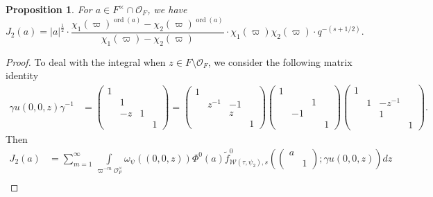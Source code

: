 \documentclass[11pt]{amsart}
\newtheorem{proposition}[theorem]{Proposition}
\theoremstyle{definition}
\theoremstyle{remark}
\newcommand{\on}{\operatorname}
\newcommand{\ord}{\on{ord}}
\begin{document}
\begin{proposition}
For $a\in F^\times \cap \mathcal{O}_F$, we have 
\begin{equation}
J_2(a)=   |a|^{\frac{1}{2}} \cdot \frac{\chi_1(\varpi)^{\ord(a)}-\chi_2(\varpi)^{\ord(a)}}{\chi_1(\varpi)-\chi_2(\varpi)}\cdot \chi_1(\varpi)\chi_2(\varpi) \cdot q^{-(s+1/2)}.
\label{eq-unramified-J2}
\end{equation}
\label{prop-unramified-J2}
\end{proposition}


\begin{proof}
To deal with the integral when $z\in F\setminus \mathcal{O}_F$, we consider the following matrix identity
\begin{equation*}
\begin{split}
\gamma  u(0,0,z) \gamma^{-1}   &=   \left( \begin{smallmatrix} 1 &&&\\&1&&\\&-z&1&\\ &&&1 \end{smallmatrix}\right) =     \left(\begin{smallmatrix} 1 &&&\\&z^{-1}&-1&\\&&z&\\ &&&1\end{smallmatrix}\right)    \left(\begin{smallmatrix} 1 &&&\\&&1&\\&-1&&\\ &&&1\end{smallmatrix}\right)   \left(\begin{smallmatrix} 1 &&&\\&1&-z^{-1}&\\&&1&\\ &&&1\end{smallmatrix}\right) .
\end{split}
\end{equation*}
Then
\begin{equation*}
\begin{split}
J_2(a) &= \sum_{m=1}^\infty  \int\limits_{ \varpi^{-m}  \mathcal{O}_F^\times}   \omega_\psi( (0, 0, z))  \Phi^0(a)       \tilde{f}_{\mathcal{W}(\tau,\psi_2), s} ^0  \left( \left(\begin{smallmatrix} a &\\&1  \end{smallmatrix}\right); \gamma u(0, 0, z)  \right)     
  dz     \\

\end{split}
\end{equation*}
\end{proof}
\end{document}
